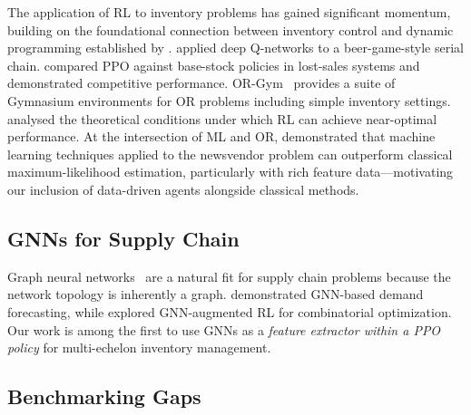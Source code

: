 \documentclass[preprint,12pt]{elsarticle}
\begin{document}
The application of RL to inventory problems has gained significant momentum,
building on the foundational connection between inventory control and
dynamic programming established by \citet{bellman1966dp}.
\citet{oroojlooyjadid2022deep} applied deep Q-networks to a beer-game-style
serial chain. \citet{gijsbrechts2022can} compared PPO against base-stock
policies in lost-sales systems and demonstrated competitive performance.
OR-Gym~\citep{hubbs2020orgym} provides a suite of Gymnasium environments
for OR problems including simple inventory settings.
\citet{devalve2023understanding} analysed the theoretical conditions under
which RL can achieve near-optimal performance.
At the intersection of ML and OR, \citet{ban2019bigdata} demonstrated
that machine learning techniques applied to the newsvendor problem can
outperform classical maximum-likelihood estimation, particularly with
rich feature data---motivating our inclusion of data-driven agents
alongside classical methods.

\subsection{GNNs for Supply Chain}

Graph neural networks~\citep{kipf2017semi, velivckovic2018graph} are a
natural fit for supply chain problems because the network topology is
inherently a graph. \citet{li2023gnn_sc} demonstrated GNN-based demand
forecasting, while \citet{berto2024rl4co} explored GNN-augmented RL for
combinatorial optimization. Our work is among the first to use GNNs as
a \emph{feature extractor within a PPO policy} for multi-echelon inventory
management.

\subsection{Benchmarking Gaps}
\end{document}
